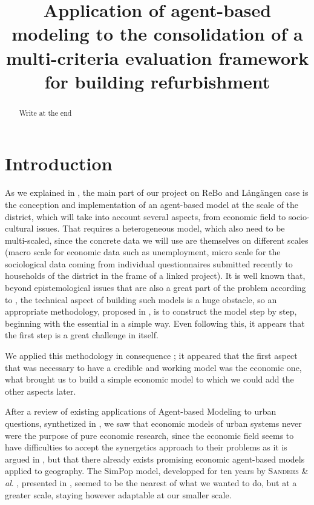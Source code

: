 \documentclass[english]{article}
\newcommand{\noun}[1]{\textsc{#1}}
\begin{document}
\title{Application of agent-based modeling to the consolidation of a multi-criteria
evaluation framework for building refurbishment}
\maketitle
\begin{abstract}
Write at the end
\end{abstract}

\section*{Introduction}

As we explained in \cite{RaimbaultReBoDescription0412}, the main
part of our project on ReBo and L{\aa}ngängen case is the conception
and implementation of an agent-based model at the scale of the district,
which will take into account several aspects, from economic field
to socio-cultural issues. That requires a heterogeneous model, which
also need to be multi-scaled, since the concrete data we will use
are themselves on different scales (macro scale for economic data
such as unemployment, micro scale for the sociological data coming
from individual questionnaires submitted recently to households of
the district in the frame of a linked project). It is well known that,
beyond epistemological issues that are also a great part of the problem
according to \cite{michel2004formalisme}, the technical aspect of
building such models is a huge obstacle, so an appropriate methodology,
proposed in \cite{Duboz:phd}, is to construct the model step by step,
beginning with the essential in a simple way. Even following this,
it appears that the first step is a great challenge in itself.

We applied this methodology in consequence ; it appeared that the
first aspect that was necessary to have a credible and working model
was the economic one, what brought us to build a simple economic model
to which we could add the other aspects later.

After a review of existing applications of Agent-based Modeling to
urban questions, synthetized in \cite{ABMReview07,ABMPers12} , we
saw that economic models of urban systems never were the purpose of
pure economic research, since the economic field seems to have difficulties
to accept the synergetics approach to their problems as it is argued
in \cite{farmer2009economy}, but that there already exists promising
economic agent-based models applied to geography. The SimPop model,
developped for ten years by \noun{Sanders} \& \textit{al}. , presented
in \cite{sanders1997simpop}, seemed to be the nearest of what we
wanted to do, but at a greater scale, staying however adaptable at
our smaller scale.
\end{document}
